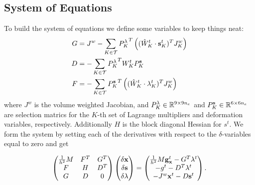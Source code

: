 \subsection{System of Equations}
To build the system of equations we define some variables to keep things neat:
\begin{align}
G &= J^w - \sum_{K \in \mathcal{T}} {P_K^{\mathbf{\lambda}}}^T \left((\hat{W}_K^{t}\cdot \mathbf{s}_K^t)^T J_K^w \right) \\
D &= -\sum_{K \in \mathcal{T}} {P_K^{\mathbf{\lambda}}}^T  W_K^t P_K^{\mathbf{s}}\\
F &= - \sum_{K \in \mathcal{T}} {P_K^{\mathbf{s}}}^T \left((\hat{W}_K^{t}\cdot \mathbf{\lambda}_K^t)^T J_K^w \right)
\end{align}
where $J^w$ is the volume weighted Jacobian, and $P_K^{\mathbf{\lambda}} \in \mathbb{R}^{9 \times 9n_e}$ and $P_K^{\mathbf{s}} \in \mathbb{R}^{6 \times 6n_e}$ are selection matrics for the $K$-th set of Lagrange multipliers and deformation variables, respectively. Additionally $H$ is the block diagonal Hessian for $s^t$. We form the system by setting each of the derivatives with respect to the $\delta$-variables equal to zero and get

\begin{equation}
\begin{pmatrix}
\frac{1}{h^2}M & F^T & G^T \\
F & H & D^T\\
G & D & 0
\end{pmatrix}
\begin{pmatrix}
\delta \mathbf{x} \\
\delta \mathbf{s} \\
\delta \mathbf{\lambda}
\end{pmatrix} =
\begin{pmatrix}
\frac{1}{h^2}M{\mathbf{g}_{\mathbf{x}}^t} - G^T \mathbf{\lambda}^t \\
 -g^t - D^T \mathbf{\lambda}^t \\
-J^w\mathbf{x}^t -D \mathbf{s}^t 
\end{pmatrix}.
\end{equation}

